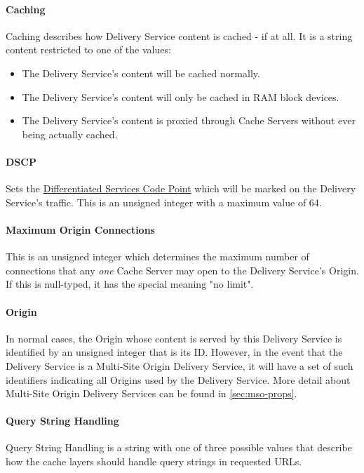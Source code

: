 \paragraph{Caching}
Caching describes how Delivery Service content is cached - if at all. It is a
string content restricted to one of the values:

\begin{itemize}
	\item {} The Delivery Service's content will be cached normally.
	\item {} The Delivery Service's content will only be cached
	in RAM block devices.
	\item {} The Delivery Service's content is proxied through
	Cache Servers without ever being actually cached.
\end{itemize}

\paragraph{DSCP}
Sets the
\href{https://tools.ietf.org/html/rfc2474}{Differentiated Services Code Point}
which will be marked on the Delivery Service's traffic. This is an unsigned
integer with a maximum value of 64.

\paragraph{Maximum Origin Connections}
This is an unsigned integer which determines the maximum number of connections
that any \emph{one} Cache Server may open to the Delivery Service's Origin.\\
If this is null-typed, it has the special meaning "no limit".

\paragraph{Origin}
In normal cases, the Origin whose content is served by this Delivery Service is
identified by an unsigned integer that is its ID. However, in the event that
the Delivery Service is a Multi-Site Origin Delivery Service, it will have a
set of such identifiers indicating all Origins used by the Delivery Service.
More detail about Multi-Site Origin Delivery Services can be found in
\ref{sec:mso-props}.

\paragraph{Query String Handling}
Query String Handling is a string with one of three possible values that
describe how the cache layers should handle query strings in requested URLs.

